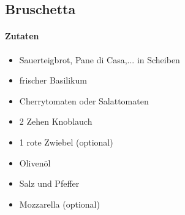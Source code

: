 \newpage
\subsection{Bruschetta}
\paragraph{Zutaten}
\begin{itemize}[noitemsep]
	\item Sauerteigbrot, Pane di Casa,... in Scheiben 
	\item frischer Basilikum
	\item Cherrytomaten oder Salattomaten
	\item 2 Zehen Knoblauch
	\item 1 rote Zwiebel (optional)
	\item Olivenöl
	\item Salz und Pfeffer
	\item Mozzarella (optional)
\end{itemize}
